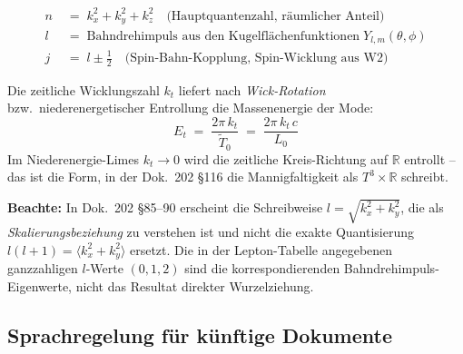 \begin{align}
  n &\;=\; k_x^2 + k_y^2 + k_z^2
       \quad\text{(Hauptquantenzahl, räumlicher Anteil)} \tag{210.5}\\
  l &\;=\; \text{Bahndrehimpuls aus den Kugelflächenfunktionen}
       \;Y_{l,m}(\theta,\phi) \tag{210.6}\\
  j &\;=\; l \pm \tfrac12
       \quad\text{(Spin-Bahn-Kopplung, Spin-Wicklung aus W2)} \tag{210.7}
\end{align}

Die zeitliche Wicklungszahl $k_t$ liefert nach
\emph{Wick-Rotation} bzw.\ niederenergetischer Entrollung die
Massenenergie der Mode:
\begin{equation}
  E_t \;=\; \frac{2\pi\, k_t}{\tilde T_0} \;=\; \frac{2\pi\,k_t\,c}{L_0}
  \tag{210.7a}
\end{equation}
Im Niederenergie-Limes $k_t \to 0$ wird die zeitliche Kreis-Richtung
auf $\mathbb{R}$ entrollt -- das ist die Form, in der Dok.~202 §116
die Mannigfaltigkeit als $T^3 \times \mathbb{R}$ schreibt.

\textbf{Beachte:} In Dok.~202 §85--90 erscheint die Schreibweise
$l = \sqrt{k_x^2+k_y^2}$, die als \emph{Skalierungsbeziehung} zu
verstehen ist und nicht die exakte Quantisierung
$l(l+1) = \langle k_x^2+k_y^2 \rangle$ ersetzt. Die in der Lepton-Tabelle
angegebenen ganzzahligen $l$-Werte $(0,1,2)$ sind die
korrespondierenden Bahndrehimpuls-Eigenwerte, nicht das Resultat
direkter Wurzelziehung.

\subsection*{Sprachregelung für künftige Dokumente}

\begin{center}
\renewcommand{\arraystretch}{1.4}
{\footnotesize
{}
}
\renewcommand{\arraystretch}{1.0}
\end{center}

